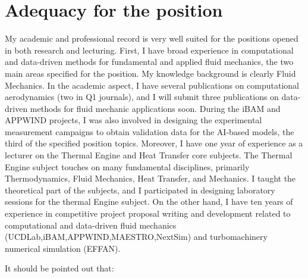 \documentclass{article}
\begin{document}
\newpage
\section{Adequacy for the position}

My academic and professional record is very well suited for the positions opened in both research and lecturing. First, I have broad experience in computational and data-driven methods for fundamental and applied fluid mechanics, the two main areas specified for the position. My knowledge background is clearly Fluid Mechanics. In the academic aspect, I have several publications on computational aerodynamics (two in Q1 journals), and I will submit three publications on data-driven methods for fluid mechanic applications soon. During the iBAM and APPWIND projects, I was also involved in designing the experimental measurement campaigns to obtain validation data for the AI-based models, the third of the specified position topics. Moreover, I have one year of experience as a lecturer on the Thermal Engine and Heat Transfer core subjects. The Thermal Engine subject touches on many fundamental disciplines, primarily Thermodynamics, Fluid Mechanics, Heat Transfer, and Mechanics. I taught the theoretical part of the subjects, and I participated in designing laboratory sessions for the thermal Engine subject. On the other hand, I have ten years of experience in competitive project proposal writing and development related to computational and data-driven fluid mechanics (UCDLab,iBAM,APPWIND,MAESTRO,NextSim) and turbomachinery numerical simulation (EFFAN). 

It should be pointed out that:
\end{document}
